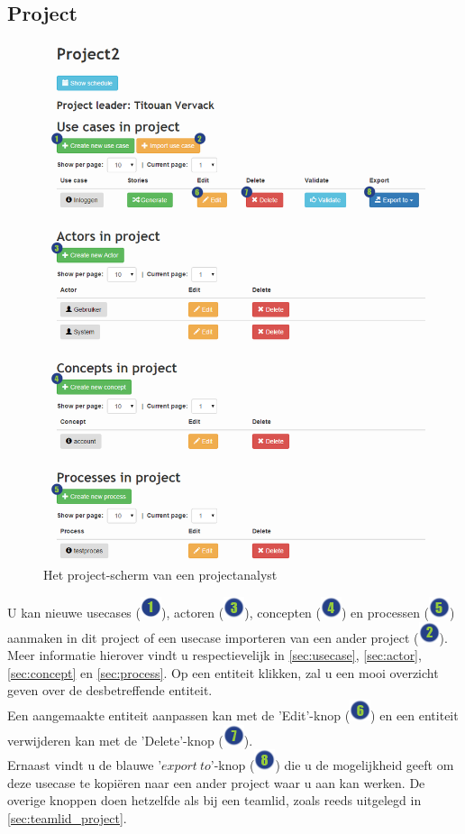 \documentclass[a4paper,11pt]{article}
\newcommand{\one}{\includegraphics[scale=0.5]{Gebruikershandleiding_img/1.png}}
\newcommand{\two}{\includegraphics[scale=0.5]{Gebruikershandleiding_img/2.png}}
\newcommand{\three}{\includegraphics[scale=0.5]{Gebruikershandleiding_img/3.png}}
\newcommand{\four}{\includegraphics[scale=0.5]{Gebruikershandleiding_img/4.png}}
\newcommand{\five}{\includegraphics[scale=0.5]{Gebruikershandleiding_img/5.png}}
\newcommand{\six}{\includegraphics[scale=0.5]{Gebruikershandleiding_img/6.png}}
\newcommand{\seven}{\includegraphics[scale=0.5]{Gebruikershandleiding_img/7.png}}
\newcommand{\eight}{\includegraphics[scale=0.5]{Gebruikershandleiding_img/8.png}}
\begin{document}
\subsection{Project}
\label{sec:projectlid_project}
\begin{figure}[H]
\centering
\includegraphics[scale=0.5]{Gebruikershandleiding_img/analyst_project.png}
\caption{Het project-scherm van een projectanalyst}
\label{fig:projectlid_project}
\end{figure}
U kan nieuwe usecases (\one), actoren (\three), concepten (\four) en processen (\five) aanmaken in dit project of een usecase importeren van een ander project (\two). Meer informatie hierover vindt u respectievelijk in \autoref{sec:usecase}, \ref{sec:actor}, \ref{sec:concept} en \ref{sec:process}. Op een entiteit klikken, zal u een mooi overzicht geven over de desbetreffende entiteit.\\
Een aangemaakte entiteit aanpassen kan met de 'Edit'-knop (\six) en een entiteit verwijderen kan met de 'Delete'-knop (\seven).\\
Ernaast vindt u de blauwe '$export\ to$'-knop (\eight) die u de mogelijkheid geeft om deze usecase te kopi\"eren naar een ander project waar u aan kan werken.
De overige knoppen doen hetzelfde als bij een teamlid, zoals reeds uitgelegd in \autoref{sec:teamlid_project}.
\end{document}
